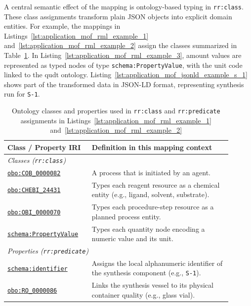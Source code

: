 A central semantic effect of the mapping is ontology-based typing in \texttt{rr:class}. These class assignments transform plain JSON objects into explicit domain entities. For example, the mappings in Listings~\ref{lst:application_mof_rml_example_1} and~\ref{lst:application_mof_rml_example_2} assign the classes summarized in Table~\ref{tab:application:mof_rml_class_definitions}. In Listing~\ref{lst:application_mof_rml_example_3}, amount values are represented as typed nodes of type \texttt{schema:PropertyValue}, with the unit code linked to the \gls{qudt} ontology. Listing~\ref{lst:application_mof_jsonld_example_s_1} shows part of the transformed data in JSON-LD format, representing synthesis run for \texttt{S-1}.

\begin{table}[htbp]
  \renewcommand{\arraystretch}{1.2}
  \centering
  \caption{Ontology classes and properties used in \texttt{rr:class} and \texttt{rr:predicate} assignments in Listings~\ref{lst:application_mof_rml_example_1} and~\ref{lst:application_mof_rml_example_2}}
  \label{tab:application:mof_rml_class_definitions}
  \begin{tabular}{p{0.32\linewidth}p{0.58\linewidth}}
    \hline
    \textbf{Class / Property IRI} & \textbf{Definition in this mapping context} \\
    \hline
    \multicolumn{2}{l}{\textit{Classes (\texttt{rr:class})}} \\
    \hline
    \href{http://purl.obolibrary.org/obo/COB_0000082}{\texttt{obo:COB\_0000082}} & A process that is initiated by an agent. \\
    \href{http://purl.obolibrary.org/obo/CHEBI_24431}{\texttt{obo:CHEBI\_24431}} & Types each reagent resource as a chemical entity (e.g., ligand, solvent, substrate). \\
    \href{http://purl.obolibrary.org/obo/OBI_0000070}{\texttt{obo:OBI\_0000070}} & Types each procedure-step resource as a planned process entity. \\
    \href{https://schema.org/PropertyValue}{\texttt{schema:PropertyValue}} & Types each quantity node encoding a numeric value and its unit. \\
    \hline
    \multicolumn{2}{l}{\textit{Properties (\texttt{rr:predicate})}} \\
    \hline
    \href{https://schema.org/identifier}{\texttt{schema:identifier}} & Assigns the local alphanumeric identifier of the synthesis component (e.g., \texttt{S-1}). \\
    \href{http://purl.obolibrary.org/obo/RO_0000086}{\texttt{obo:RO\_0000086}} & Links the synthesis vessel to its physical container quality (e.g., glass vial). \\

\end{tabular}
\end{table}
